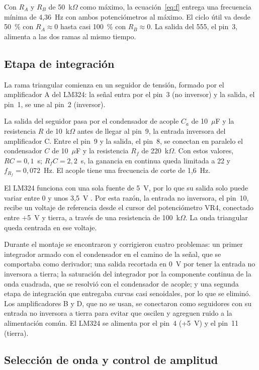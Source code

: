\documentclass[conference]{IEEEtran}
\begin{document}
Con $R_A$ y $R_B$ de 50~k$\Omega$ como máximo, la ecuación~\eqref{eq:f} entrega una frecuencia mínima de 4,36~Hz con ambos potenciómetros al máximo. El ciclo útil va desde 50~\% con $R_A \approx 0$ hasta casi 100~\% con $R_B \approx 0$. La salida del 555, el pin~3, alimenta a las dos ramas al mismo tiempo.

\subsection{Etapa de integración}

La rama triangular comienza en un seguidor de tensión, formado por el amplificador A del LM324: la señal entra por el pin~3 (no inversor) y la salida, el pin~1, se une al pin~2 (inversor).

La salida del seguidor pasa por el condensador de acople $C_a$ de 10~$\mu$F y la resistencia $R$ de 10~k$\Omega$ antes de llegar al pin~9, la entrada inversora del amplificador C. Entre el pin~9 y la salida, el pin~8, se conectan en paralelo el condensador $C$ de 10~$\mu$F y la resistencia $R_f$ de 220~k$\Omega$. Con estos valores, $RC = 0{,}1$~s; $R_fC = 2{,}2$~s, la ganancia en continua queda limitada a 22 y $f_{R_f} = 0{,}072$~Hz. El acople tiene una frecuencia de corte de 1,6~Hz.

El LM324 funciona con una sola fuente de 5~V, por lo que su salida solo puede variar entre 0 y unos 3,5~V \cite{lm324}. Por esta razón, la entrada no inversora, el pin~10, recibe un voltaje de referencia desde el cursor del potenciómetro VR4, conectado entre +5~V y tierra, a través de una resistencia de 100~k$\Omega$. La onda triangular queda centrada en ese voltaje.

Durante el montaje se encontraron y corrigieron cuatro problemas: un primer integrador armado con el condensador en el camino de la señal, que se comportaba como derivador; una salida recortada en 0~V por tener la entrada no inversora a tierra; la saturación del integrador por la componente continua de la onda cuadrada, que se resolvió con el condensador de acople; y una segunda etapa de integración que entregaba curvas casi senoidales, por lo que se eliminó. Los amplificadores B y D, que no se usan, se conectaron como seguidores con su entrada no inversora a tierra para evitar que oscilen y agreguen ruido a la alimentación común. El LM324 se alimenta por el pin~4 (+5~V) y el pin~11 (tierra).

\subsection{Selección de onda y control de amplitud}
\end{document}
